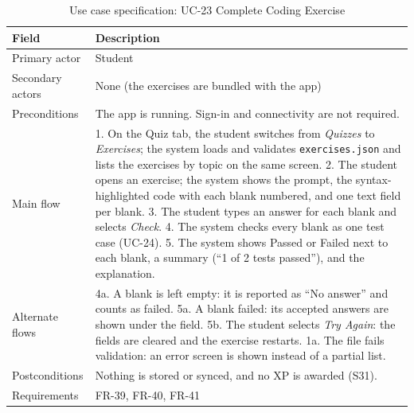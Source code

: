 \documentclass[12pt,letterpaper]{article}
\begin{document}
\begin{table}[H]
\centering
\caption{Use case specification: UC-23 Complete Coding Exercise}
\label{tab:uc23}
\begin{tabularx}{\textwidth}{@{}L{3.0cm} Y@{}}
\toprule
\textbf{Field} & \textbf{Description} \\
\midrule
Primary actor & Student \\
Secondary actors & None (the exercises are bundled with the app) \\
Preconditions & The app is running. Sign-in and connectivity are not required. \\
Main flow & 1. On the Quiz tab, the student switches from \emph{Quizzes} to \emph{Exercises}; the system loads and validates \texttt{exercises.json} and lists the exercises by topic on the same screen. 2. The student opens an exercise; the system shows the prompt, the syntax-highlighted code with each blank numbered, and one text field per blank. 3. The student types an answer for each blank and selects \emph{Check}. 4. The system checks every blank as one test case (UC-24). 5. The system shows Passed or Failed next to each blank, a summary (``1 of 2 tests passed''), and the explanation. \\
Alternate flows & 4a. A blank is left empty: it is reported as ``No answer'' and counts as failed. 5a. A blank failed: its accepted answers are shown under the field. 5b. The student selects \emph{Try Again}: the fields are cleared and the exercise restarts. 1a. The file fails validation: an error screen is shown instead of a partial list. \\
Postconditions & Nothing is stored or synced, and no XP is awarded (S31). \\
Requirements & FR-39, FR-40, FR-41 \\
\bottomrule
\end{tabularx}
\end{table}
\end{document}
